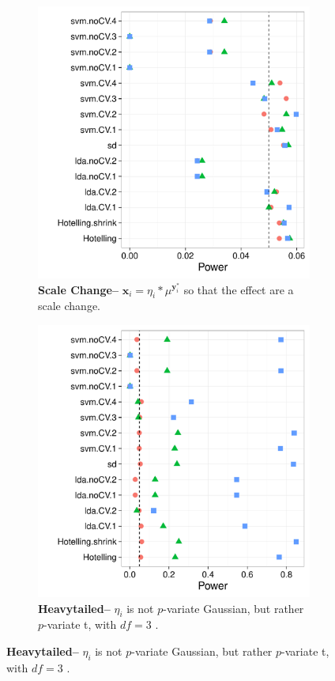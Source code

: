 \documentclass[12pt,a4paper]{article}
\theoremstyle{definition}
\newcommand{\rv}[1]{\mathbf{#1}} %
\newcommand{\x}{\rv x} %
\newcommand{\y}{\rv y} %
\newcommand{\mycaption}{Simulation details in Appendix~\ref{apx:simulation_details} except the changes in the sub-captions.}
\begin{document}
\begin{figure}[h]
\centering
\caption{\mycaption}	
	\begin{subfigure}{.5\textwidth}
	  \centering
	  \includegraphics[width=1\linewidth]{"art/2016-07-30 10:33:05"}
	  \caption{\textbf{Scale Change--} $\x_i =  \eta_i * \mu^ {\y^*_i}$ so that the effect are a scale change.}  
	\label{fig:scale_change}
	\end{subfigure}%
	\begin{subfigure}{.5\textwidth}
	  \centering
	  \includegraphics[width=1\linewidth]{"art/2016-08-04 19:32:17"}
	  \caption{\textbf{Heavytailed--} $\eta_i$ is not $p$-variate Gaussian, but rather $p$-variate t, with $df=3$ .  } 
	\label{fig:t_null}
	\end{subfigure}
\end{figure}
\end{document}
